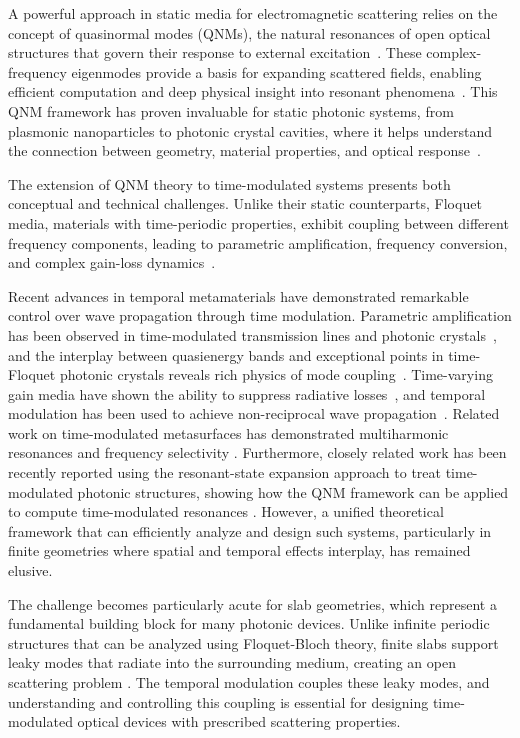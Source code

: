 \documentclass[%
 reprint,
 amsmath,amssymb,
 aps,
 prb,
]{revtex4-2}
\newcommand{\corrections}[1]{#1}
\begin{document}
A powerful approach in static media for electromagnetic scattering relies on the concept of quasinormal modes (QNMs), the natural resonances of open optical structures that govern their response to external excitation~\cite{Lalanne2018light, Kristensen2020modes}. These complex-frequency eigenmodes provide a basis for expanding scattered fields, enabling efficient computation and deep physical insight into resonant phenomena~\cite{ching1998, vial2014, sauvan2022}. This QNM framework has proven invaluable for static photonic systems, from plasmonic nanoparticles to photonic crystal cavities, where it helps understand the connection between geometry, material properties, and optical response~\cite{Bai2013efficient, Yan2018rigorous}.

The extension of QNM theory to time-modulated systems presents both conceptual and technical challenges. Unlike their static counterparts, Floquet media, materials with time-periodic properties, exhibit coupling between different frequency components, leading to parametric amplification, frequency conversion, and complex gain-loss dynamics~\cite{Cassedy1967dispersion, Felsen1970time}.

Recent advances in temporal metamaterials have demonstrated remarkable control over wave propagation through time modulation. Parametric amplification has been observed in time-modulated transmission lines and photonic crystals~\cite{ValdezGarcia2024parametric, Planat2020Josephson}\corrections{, and the interplay between quasienergy bands and exceptional points in time-Floquet photonic crystals reveals rich physics of mode coupling~\cite{wang2021b}}. Time-varying gain media have shown the ability to suppress radiative losses~\cite{hooper2025}, and temporal modulation has been used to achieve non-reciprocal wave propagation~\cite{tessierbrothelande2023}. \corrections{Related work on time-modulated metasurfaces has demonstrated multiharmonic resonances and frequency selectivity \cite{koutserimpas2023,koutserimpas2025}.} \corrections{Furthermore, closely related work has been recently reported using the resonant-state expansion approach to treat time-modulated photonic structures, showing how the QNM framework can be applied to compute time-modulated resonances \cite{valero2025resonantstatesstructuredphotonic}.}
However, a unified theoretical framework that can efficiently analyze and design such systems, particularly in finite geometries where spatial and temporal effects interplay, has remained elusive.


The challenge becomes particularly acute for slab geometries, which represent a fundamental building block for many photonic devices. Unlike infinite periodic structures that can be analyzed using Floquet-Bloch theory, finite slabs support leaky modes that radiate into the surrounding medium, creating an open scattering problem \cite{Wu2025reflections}. The temporal modulation couples these leaky modes, and understanding and controlling this coupling is essential for designing time-modulated optical devices with prescribed scattering properties.
\end{document}

